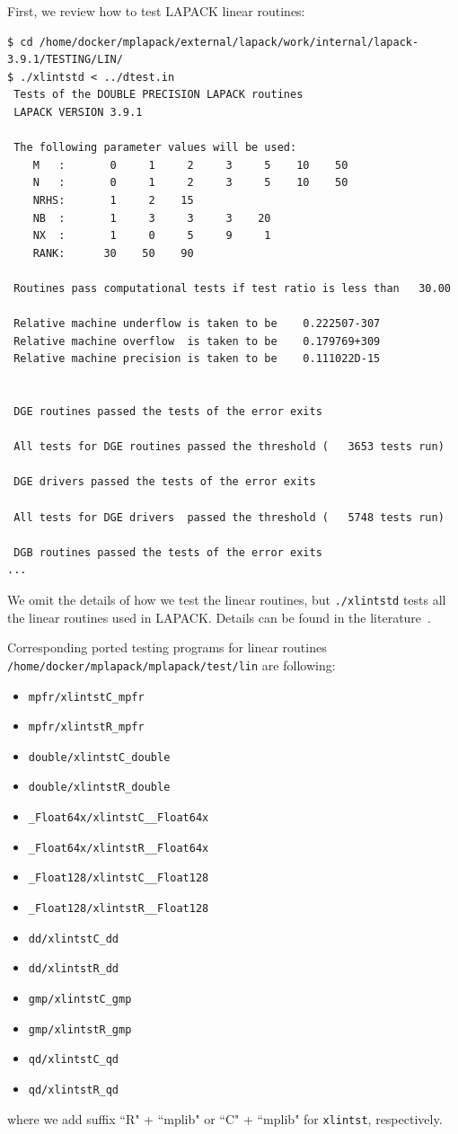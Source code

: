 \documentclass[12pt]{article}
\begin{document}
First, we review how to test LAPACK linear routines:
\begin{verbatim}
$ cd /home/docker/mplapack/external/lapack/work/internal/lapack-3.9.1/TESTING/LIN/
$ ./xlintstd < ../dtest.in
 Tests of the DOUBLE PRECISION LAPACK routines
 LAPACK VERSION 3.9.1

 The following parameter values will be used:
    M   :       0     1     2     3     5    10    50
    N   :       0     1     2     3     5    10    50
    NRHS:       1     2    15
    NB  :       1     3     3     3    20
    NX  :       1     0     5     9     1
    RANK:      30    50    90

 Routines pass computational tests if test ratio is less than   30.00

 Relative machine underflow is taken to be    0.222507-307
 Relative machine overflow  is taken to be    0.179769+309
 Relative machine precision is taken to be    0.111022D-15


 DGE routines passed the tests of the error exits

 All tests for DGE routines passed the threshold (   3653 tests run)

 DGE drivers passed the tests of the error exits

 All tests for DGE drivers  passed the threshold (   5748 tests run)

 DGB routines passed the tests of the error exits
...
\end{verbatim}
We omit the details of how we test the linear routines, but {\tt ./xlintstd} tests all the linear routines used in LAPACK.
Details can be found in the literature~\cite{lawn41}.

Corresponding ported testing programs for linear routines {\tt /home/docker/mplapack/mplapack/test/lin} are following:
\begin{itemize}
    \item {\tt mpfr/xlintstC\_mpfr}
    \item {\tt mpfr/xlintstR\_mpfr}
    \item {\tt double/xlintstC\_double}
    \item {\tt double/xlintstR\_double}
    \item {\tt \_Float64x/xlintstC\_\_Float64x}
    \item {\tt \_Float64x/xlintstR\_\_Float64x}
    \item {\tt \_Float128/xlintstC\_\_Float128}
    \item {\tt \_Float128/xlintstR\_\_Float128}
    \item {\tt dd/xlintstC\_dd}
    \item {\tt dd/xlintstR\_dd}
    \item {\tt gmp/xlintstC\_gmp}
    \item {\tt gmp/xlintstR\_gmp}
    \item {\tt qd/xlintstC\_qd}
    \item {\tt qd/xlintstR\_qd}
\end{itemize}
where we add suffix ``R" + ``mplib" or ``C" + ``mplib" for {\tt xlintst}, respectively.
\end{document}
